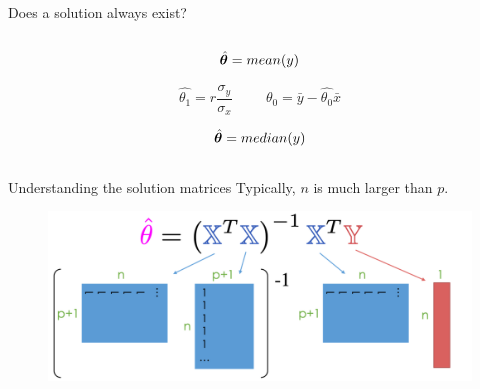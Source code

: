 \documentclass[aspectratio=169]{../latex_main/tntbeamer}  %
\begin{document}
\begin{frame}{Does a solution always exist?}
\begin{columns}
	        \begin{column}{.4\textwidth}
	        
	            \bigksip
	                \begin{equation*}
	                    \hat{\bm{\theta}} = mean(y)
	                \end{equation*}
	                
	                \begin{equation*}
	                    \hat{{\theta}_1} = r\frac{\sigma_y}{\sigma_x} \hspace{1cm}
	                    \hat{{\theta}_0} = \bar{y} - \hat{{\theta}_0}\bar{x}
	                \end{equation*}
	                
	                
	                \begin{equation*}
	                    \hat{\bm{\theta}} = median(y)
	                \end{equation*}
	                
	        \end{column}
	    \end{columns}
	\end{frame}
	
	
	
	\begin{frame}{Understanding the solution matrices}
	    Typically, $n$ is much larger than $p$.
	    \begin{figure}
	        \centering
	        \includegraphics[scale=.45]{Bild13}
	    \end{figure}
	\end{frame}
	
\end{document}
